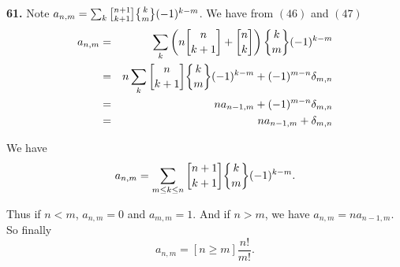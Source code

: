 \documentclass[a4paper,12pt]{article}
\newcommand{\newpar}[1]{\bigskip \noindent \textbf{#1.}}
\newcommand{\stirlingone}[2]{{#1 \atopwithdelims[]#2}}
\newcommand{\stirlingtwo}[2]{{#1 \atopwithdelims\{\}#2}}
\begin{document}
\newpar{61} Note $a_{n,m} = \sum_k
\stirlingone{n+1}{k+1}\stirlingtwo{k}{m}(-1)^{k-m}$.  We have from
$(46)$ and $(47)$
\begin{eqnarray*}
  a_{n,m} &=&
  \sum_k \left( n \stirlingone{n}{k+1} + \stirlingone{n}{k}\right)
  \stirlingtwo{k}{m} (-1)^{k-m} \\
  &=& n \sum_k \stirlingone{n}{k+1} \stirlingtwo{k}{m} (-1)^{k-m} +
  (-1)^{m-n} \delta_{m,n} \\
  &=& n a_{n-1,m} + (-1)^{m-n}\delta_{m,n} \\
  &=& n a_{n-1,m} + \delta_{m,n}
\end{eqnarray*}

We have
\[ a_{n,m} = \sum_{m \le k \le n} \stirlingone{n+1}{k+1}
\stirlingtwo{k}{m}(-1)^{k-m}.\]

Thus if $n<m$, $a_{n,m} = 0$ and $a_{m,m} = 1$.  And if $n > m$, we
have $a_{n,m} = n a_{n-1,m}$.  So finally
\[ a_{n,m} = [ n \ge m ] \frac{n!}{m!}.\]
\end{document}
